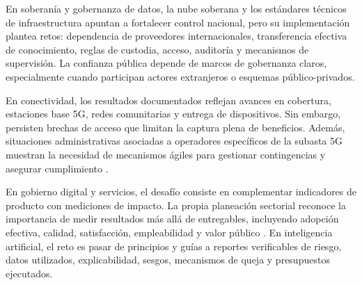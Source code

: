 \documentclass[9pt,letterpaper,twocolumn,twoside,apabib]{rho-class/rho}
\begin{document}
En soberanía y gobernanza de datos, la nube soberana y los estándares técnicos de infraestructura apuntan a fortalecer control nacional, pero su implementación plantea retos: dependencia de proveedores internacionales, transferencia efectiva de conocimiento, reglas de custodia, acceso, auditoría y mecanismos de supervisión. La confianza pública depende de marcos de gobernanza claros, especialmente cuando participan actores extranjeros o esquemas público-privados.

En conectividad, los resultados documentados reflejan avances en cobertura, estaciones base 5G, redes comunitarias y entrega de dispositivos. Sin embargo, persisten brechas de acceso que limitan la captura plena de beneficios. Además, situaciones administrativas asociadas a operadores específicos de la subasta 5G muestran la necesidad de mecanismos ágiles para gestionar contingencias y asegurar cumplimiento \parencite{mintic_telecall_espectro_5g_2025,lorduy_telecall_conciliacion_2026}.

En gobierno digital y servicios, el desafío consiste en complementar indicadores de producto con mediciones de impacto. La propia planeación sectorial reconoce la importancia de medir resultados más allá de entregables, incluyendo adopción efectiva, calidad, satisfacción, empleabilidad y valor público \parencite{mintic_indicadores_impacto_2026}. En inteligencia artificial, el reto es pasar de principios y guías a reportes verificables de riesgo, datos utilizados, explicabilidad, sesgos, mecanismos de queja y presupuestos ejecutados.




\end{document}
